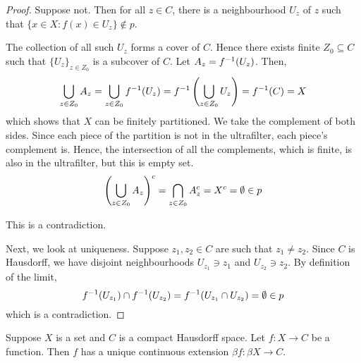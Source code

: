 \documentclass[11pt,letterpaper]{article}
\begin{document}
\begin{proof}
    Suppose not. Then for all $z \in C$, there is a neighbourhood $U_z$ of $z$
    such that $\{ x \in X : f(x) \in U_z \} \notin p$.

    The collection of all such $U_z$ forms a cover of $C$. Hence there exists
    finite $Z_0 \subseteq C$ such that $\{U_z\}_{z \in Z_0}$ is a subcover of
    $C$. Let $A_z = f^{-1} (U_z)$. Then,
    \begin{equation*}
        \bigcup_{z \in Z_0} A_z
        = \bigcup_{z \in Z_0} f^{-1} (U_z)
        = f^{-1} \left( \bigcup_{z \in Z_0} U_z \right)
        = f^{-1} (C)
        = X
    \end{equation*}
    which shows that $X$ can be finitely partitioned. We take the complement of
    both sides. Since each piece of the partition is not in the ultrafilter,
    each piece's complement is. Hence, the intersection of all the complements,
    which is finite, is also in the ultrafilter, but this is empty set.
    \begin{align*}
        \left( \bigcup_{z \in Z_0} A_z \right)^c
        = \bigcap_{z \in Z_0} A_z^c
        = X^c
        = \emptyset
        \in p
    \end{align*}

    This is a contradiction.

    Next, we look at uniqueness. Suppose $z_1, z_2 \in C$ are such that
    $z_1 \neq z_2$. Since $C$ is Hausdorff, we have disjoint neighbourhoods
    $U_{z_1} \ni z_1$ and $U_{z_2} \ni z_2$. By definition of the limit,
    \begin{equation*}
        f^{-1} (U_{z_1}) \cap f^{-1} (U_{z_2})
        = f^{-1} (U_{z_1} \cap U_{z_2})
        = \emptyset
        \in p
    \end{equation*}
    which is a contradiction.
\end{proof}

\begin{prop}
    Suppose $X$ is a set and $C$ is a compact Hausdorff space.
    Let $f : X \to C$ be a function. Then $f$ has a unique continuous extension
    $\beta f : \beta X \to C$.
\end{prop}
\end{document}
